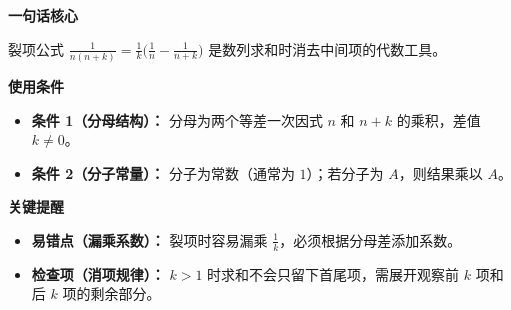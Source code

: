 \begin{summarybox}
	\textbf{\textcolor{CSummary}{一句话核心}}

	裂项公式 $\frac{1}{n(n+k)} = \frac{1}{k}\bigl(\frac{1}{n} - \frac{1}{n+k}\bigr)$ 是数列求和时消去中间项的代数工具。

	\medskip
	\textbf{\textcolor{CSummary}{使用条件}}
	\begin{itemize}[leftmargin=*, itemsep=0.5em, topsep=0.4em]
		\item \textbf{条件 1（分母结构）：} 分母为两个等差一次因式 $n$ 和 $n+k$ 的乘积，差值 $k\neq0$。
		\item \textbf{条件 2（分子常量）：} 分子为常数（通常为 $1$）；若分子为 $A$，则结果乘以 $A$。
	\end{itemize}

	\medskip
	\textbf{\textcolor{CSummary}{关键提醒}}
	\begin{itemize}[leftmargin=*, itemsep=0.5em, topsep=0.4em]
		\item \textbf{易错点（漏乘系数）：} 裂项时容易漏乘 $\frac{1}{k}$，必须根据分母差添加系数。
		\item \textbf{检查项（消项规律）：} $k>1$ 时求和不会只留下首尾项，需展开观察前 $k$ 项和后 $k$ 项的剩余部分。
	\end{itemize}
\end{summarybox}
